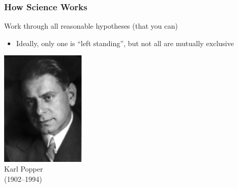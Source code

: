 \documentclass[10pt]{beamer}
\begin{document}
\begin{frame}[t]
\frametitle{How Science Works}
\vspace{0.5cm}

	Work through all reasonable hypotheses (that you can)\\
		\medskip
		\begin{itemize}
			\item Ideally, only one is ``left standing'', but not all are mutually exclusive
		\end{itemize}
	
	\vspace{0.25cm}
	
	\begin{center}
		\includegraphics[width=0.3\textwidth]{figures/popper.jpg}\\
		Karl Popper\\
		(1902--1994)
	\end{center}	
\end{frame}
\end{document}
